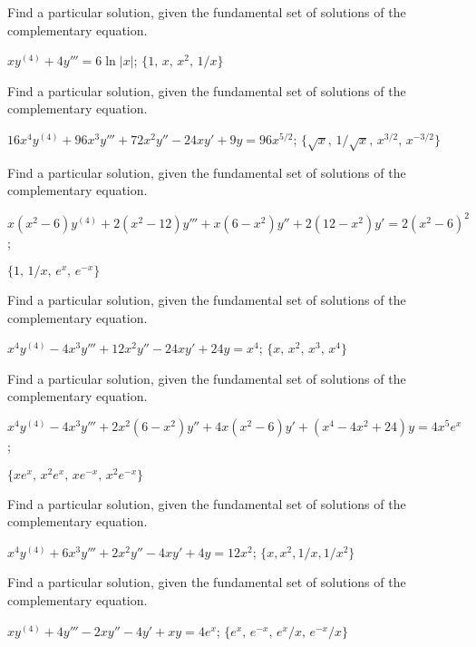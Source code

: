 \documentclass{ximera}
\begin{document}
\begin{problem}\label{exer:9.4.13}
Find a particular
solution, given the fundamental set of solutions of the complementary equation.

$xy^{(4)}+4y'''=6 \ln |x|$; \quad   $\{1,\,x,\,x^2,\,1/x\}$
\end{problem}

\begin{problem}\label{exer:9.4.14}
Find a particular
solution, given the fundamental set of solutions of the complementary equation.

$16x^4y^{(4)}+96x^3y'''+72x^2y''-24xy'+9y=96x^{5/2}$; \quad
$\{\sqrt x,\,1/\sqrt x,\,x^{3/2},\,x^{-3/2}\}$
\end{problem}

\begin{problem}\label{exer:9.4.15}
Find a particular
solution, given the fundamental set of solutions of the complementary equation.

$x(x^2-6)y^{(4)}+2(x^2-12)y'''+x(6-x^2)y''+2(12-x^2)y'=2(x^2-6)^2$; \quad

 $\{1,\,1/x,\,e^x,\,e^{-x}\}$
\end{problem}

\begin{problem}\label{exer:9.4.16}
Find a particular
solution, given the fundamental set of solutions of the complementary equation.

$x^4y^{(4)}-4x^3y'''+12x^2y''-24xy'+24y=x^4$; \quad
$\{x,\,x^2,\,x^3,\,x^4\}$
\end{problem}

\begin{problem}\label{exer:9.4.17}
Find a particular
solution, given the fundamental set of solutions of the complementary equation.

$x^4y^{(4)}-4x^3y'''+2x^2(6-x^2)y''+4x(x^2-6)y'+(x^4-4x^2+24)y=4x^5e^x$;
\quad

 $\{xe^x,\,x^2e^x,\,xe^{-x},\,x^2e^{-x}\}$
\end{problem}

\begin{problem}\label{exer:9.4.18}
Find a particular
solution, given the fundamental set of solutions of the complementary equation.

$x^4y^{(4)}+6x^3y'''+2x^2y''-4xy'+4y=12x^2$;   \quad
$\{x,x^2,1/x,1/x^2\}$
\end{problem}

\begin{problem}\label{exer:9.4.19}
Find a particular
solution, given the fundamental set of solutions of the complementary equation.

$xy^{(4)}+4y'''-2xy''-4y'+xy=4e^x$; \quad
$\{e^x,\,e^{-x},\,e^x/x,\,e^{-x}/x\}$
\end{problem}
\end{document}
